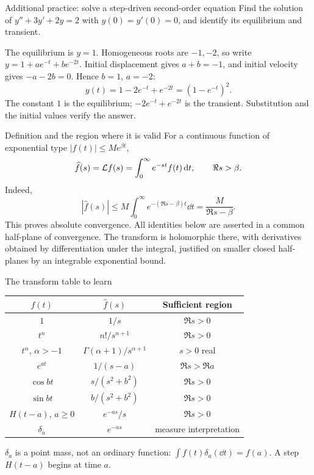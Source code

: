 \begin{question}{Additional practice: solve a step-driven second-order equation}
Find the solution of $y''+3y'+2y=2$ with $y(0)=y'(0)=0$, and identify its equilibrium and transient.
\end{question}
\begin{answer}
The equilibrium is $y=1$. Homogeneous roots are $-1,-2$, so write $y=1+ae^{-t}+be^{-2t}$. Initial displacement gives $a+b=-1$, and initial velocity gives $-a-2b=0$. Hence $b=1$, $a=-2$:
\[y(t)=1-2e^{-t}+e^{-2t}=(1-e^{-t})^2.\]
The constant $1$ is the equilibrium; $-2e^{-t}+e^{-2t}$ is the transient. Substitution and the initial values verify the answer.
\end{answer}

\begin{concept}{Definition and the region where it is valid}
For a continuous function of exponential type $|f(t)|\leq Me^{\beta t}$,
\[\widehat f(s)=\mathcal L f(s)=\int_0^\infty e^{-st}f(t)\,\mathrm d t,\qquad\Re s>\beta.\]
Indeed,
\[|\widehat f(s)|\leq M\int_0^\infty e^{-(\Re s-\beta)t}\dd t=\frac{M}{\Re s-\beta}.\]
This proves absolute convergence. All identities below are asserted in a common half-plane of convergence. The transform is holomorphic there, with derivatives obtained by differentiation under the integral, justified on smaller closed half-planes by an integrable exponential bound.
\end{concept}
\begin{concept}{The transform table to learn}
\begin{center}
\begin{tabular}{c c c}
\toprule $f(t)$&$\widehat f(s)$&Sufficient region\\\midrule
$1$&$1/s$&$\Re s>0$\\
$t^n$&$n!/s^{n+1}$&$\Re s>0$\\
$t^\alpha$, $\alpha>-1$&$\Gamma(\alpha+1)/s^{\alpha+1}$&$s>0$ real\\
$e^{at}$&$1/(s-a)$&$\Re s>\Re a$\\
$\cos bt$&$s/(s^2+b^2)$&$\Re s>0$\\
$\sin bt$&$b/(s^2+b^2)$&$\Re s>0$\\
$H(t-a)$, $a\geq0$&$e^{-as}/s$&$\Re s>0$\\
$\delta_a$&$e^{-as}$&measure interpretation\\\bottomrule
\end{tabular}
\end{center}
$\delta_a$ is a point mass, not an ordinary function: $\int f(t)\delta_a(\dd t)=f(a)$. A step $H(t-a)$ begins at time $a$.
\end{concept}
